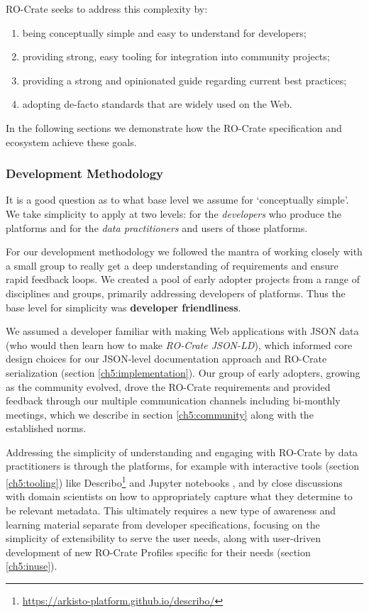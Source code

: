 RO-Crate seeks to address this complexity by:

\begin{enumerate}
  \item[1.] being conceptually simple and easy to understand for developers;
  \item[2.] providing strong, easy tooling for integration into community projects;
  \item[3.] providing a strong and opinionated guide regarding current best practices;
  \item[4.] adopting de-facto standards that are widely used on the Web.
\end{enumerate}

In the following sections we demonstrate how the RO-Crate specification
and ecosystem achieve these goals.

\subsubsection{Development Methodology}\label{ch5:methodology}

It is a good question as to what base level we assume for `conceptually
simple'. We take simplicity to apply at two levels: for the
\emph{developers} who produce the platforms and for the \emph{data
practitioners} and users of those platforms.

For our development methodology we followed the mantra of working
closely with a small group to really get a deep understanding of
requirements and ensure rapid feedback loops. We created a pool of early
adopter projects from a range of disciplines and groups, primarily
addressing developers of platforms. Thus the base level for simplicity
was \textbf{developer friendliness}.

We assumed a developer familiar with making Web applications with JSON
data (who would then learn how to make \emph{RO-Crate JSON-LD}), which
informed core design choices for our JSON-level documentation approach
and RO-Crate serialization (section \vref{ch5:implementation}). Our group of early
adopters, growing as the community evolved, drove the RO-Crate
requirements and provided feedback through our multiple communication
channels including bi-monthly meetings, which we describe in section \vref{ch5:community} along with the established norms.

Addressing the simplicity of understanding and engaging with RO-Crate by
data practitioners is through the platforms, for example with
interactive tools (section \vref{ch5:tooling}) like
Describo\footnote{\url{https://arkisto-platform.github.io/describo/}} \cite{ch5-78} and
Jupyter notebooks
\cite{ch5-70}, and by
close discussions with domain scientists on how to appropriately capture
what they determine to be relevant metadata. This ultimately requires a
new type of awareness and learning material separate from developer
specifications, focusing on the simplicity of extensibility to serve the
user needs, along with user-driven development of new RO-Crate Profiles
specific for their needs (section \vref{ch5:inuse}).

